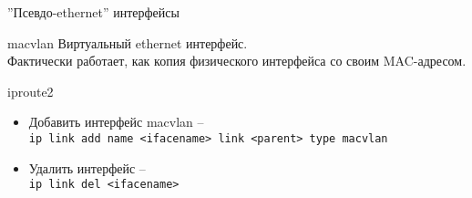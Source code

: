 \begin{frame}{''Псевдо-ethernet'' интерфейсы}
	\begin{block}{macvlan}
        Виртуальный ethernet интерфейс.\\
        Фактически работает, как копия физического интерфейса со своим MAC-адресом.
	\end{block}

	\begin{block}{iproute2}
		\begin{itemize}
			\item Добавить интерфейс macvlan -- \\
                {\tt ip link add name <ifacename> link <parent> type macvlan}
			\item Удалить интерфейс -- \\ 
                {\tt ip link del <ifacename>}
		\end{itemize}
	\end{block}

\end{frame}

